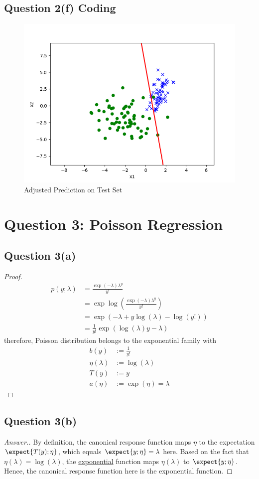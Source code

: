 \documentclass[11pt]{article}
\begin{document}
	\newpage
	\subsection{Question 2(f) Coding}
	\begin{figure}[h]
		\centering
		\includegraphics[width=0.6\linewidth]{src/posonly/posonly_adjusted_pred.png}
		\caption{Adjusted Prediction on Test Set}
	\end{figure}
	
	\newpage
	
	\section{Question 3: Poisson Regression}
	\subsection{Question 3(a)}
	\begin{proof}
		\begin{align}
			p(y; \lambda) &= \frac{\exp(-\lambda) \lambda^y}{y!} \\
			&= \exp \log (\frac{\exp(-\lambda) \lambda^y}{y!}) \\
			&= \exp \left (
				- \lambda + y \log (\lambda) - \log(y!)
			\right ) \\
			&= \frac{1}{y!} \exp(\log(\lambda) y - \lambda)
		\end{align}
		therefore, Poisson distribution belongs to the exponential family with
		\begin{align}
			b(y) &:= \frac{1}{y!} \\
			\eta(\lambda) &:= \log(\lambda) \\
			T(y) &:= y \\
			a(\eta) &:= \exp(\eta) = \lambda
		\end{align}
	\end{proof}
	\newpage
	
	\subsection{Question 3(b)}
	\begin{proof}[Answer.]
	\par By definition, the canonical response function maps $\eta$ to the expectation $\expect{T(y); \eta}$, which equals $\expect{y; \eta} = \lambda$ here. Based on the fact that $\eta(\lambda) = \log(\lambda)$, the \ul{exponential} function maps $\eta(\lambda)$ to $\expect{y; \eta}$. Hence, the canonical response function here is the exponential function.
	\end{proof}
	
\end{document}
